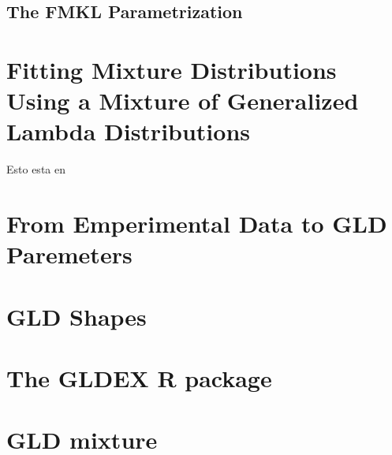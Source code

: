 \subsection{The FMKL Parametrization}

\section{Fitting Mixture Distributions Using a Mixture of Generalized Lambda Distributions}
Esto esta en \cite{Tobergte2013}

\section{From Emperimental Data to GLD Paremeters}
\cite{Lampasi2006}

\section{GLD Shapes}

\section{The GLDEX R package}\label{sec:gldex}

\section{GLD mixture}

